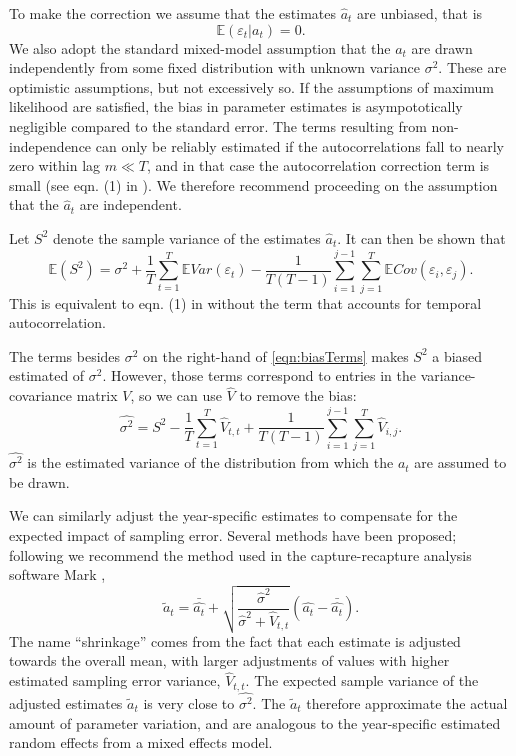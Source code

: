 \documentclass[12pt]{article}
\newcommand{\be}{\begin{equation}}
\newcommand{\ee}{\end{equation}}
\begin{document}
To make the correction we assume that the estimates $\hat{a}_t$ are unbiased, that is
\be
\mathbb{E}(\varepsilon_t \vert a_t) = 0.    
\ee
We also adopt the standard mixed-model assumption that the $a_t$ are drawn 
independently from some fixed distribution with unknown variance $\sigma^2$. 
These are optimistic assumptions, but not excessively so. If the assumptions of maximum likelihood are satisfied, 
the bias in parameter estimates is asympototically negligible compared to the standard error. 
The terms resulting from non-independence can only be reliably estimated if 
the autocorrelations fall to nearly zero within lag $m \ll T$, 
and in that case the autocorrelation correction term is small (see eqn. (1) in \citet{gould-nichols-1998}). 
We therefore recommend proceeding on the assumption that the $\hat{a}_t$ are independent. 

Let $S^2$ denote the sample variance of the estimates $\hat{a}_t$. It can then be shown that 
\be
\mathbb{E}(S^2) = \sigma^2  + \frac{1}{T}\sum\limits_{t=1}^T \mathbb{E} Var(\varepsilon_t) 
- \frac{1}{T(T-1)}\sum\limits_{i=1}^{j-1} \sum\limits_{j=1}^T \mathbb{E}Cov(\varepsilon_i, \varepsilon_j). 
\label{eqn:biasTerms}
\ee
This is equivalent to eqn. (1) in \citet{gould-nichols-1998} without the term that 
accounts for temporal autocorrelation. 

The terms besides $\sigma^2$ on the right-hand of \eqref{eqn:biasTerms} makes $S^2$ a biased estimated of $\sigma^2$. 
However, those terms correspond to entries in the variance-covariance matrix $V$, so we can use $\hat{V}$ to remove 
the bias: 
\be
\hat{\sigma^2}  = S^2 - \frac{1}{T}\sum\limits_{t=1}^T \hat{V}_{t,t} + 
\frac{1}{T(T-1)}\sum\limits_{i=1}^{j-1} \sum\limits_{j=1}^T \hat{V}_{i,j}. 
\label{eqn:hatSigma}
\ee
$\hat{\sigma^2}$ is the estimated variance of the distribution from which the $a_t$ are assumed
to be drawn. 

We can similarly adjust the year-specific estimates to compensate for the expected impact of sampling error. Several methods  
have been proposed; following \citet{metcalf-etal-2015} we recommend the method used in the 
capture-recapture analysis software Mark \citet{cooch-white-2020}, 
\be
\widetilde{a}_t = \bar{\hat{a_t}} + \sqrt{\frac{\hat{\sigma}^2}{\hat{\sigma}^2 + \hat{V}_{t,t}}}\left (\hat{a_t} - \bar{\hat{a_t}} \right). 
\label{eqn:ShrinkLess}
\ee
The name ``shrinkage'' comes from the fact that each estimate is adjusted towards the overall mean, with 
larger adjustments of values with higher estimated sampling error variance, $\hat{V}_{t,t}$. 
The expected sample variance of the adjusted estimates $\widetilde{a}_t$ is very close to $\hat{\sigma^2}$. 
The $\widetilde{a}_t$ therefore approximate the actual amount of parameter variation, and are analogous to the 
year-specific estimated random effects from a mixed effects model. 
\end{document}
